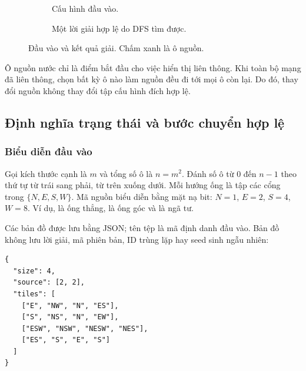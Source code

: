 \begin{figure}[H]
\centering
\begin{subfigure}{.43\textwidth}\centering
{}\caption{Cấu hình đầu vào.}\end{subfigure}
\hspace{8mm}
\begin{subfigure}{.43\textwidth}\centering
{}\caption{Một lời giải hợp lệ do DFS tìm được.}\end{subfigure}
\caption{Đầu vào  và kết quả giải. Chấm xanh là ô nguồn.}
\label{fig:board}
\end{figure}

Ô nguồn nước chỉ là điểm bắt đầu cho việc hiển thị liên thông. Khi toàn bộ
mạng đã liên thông, chọn bất kỳ ô nào làm nguồn đều đi tới mọi ô còn lại.
Do đó, thay đổi nguồn không thay đổi tập cấu hình đích hợp lệ.

\subsection{Định nghĩa trạng thái và bước chuyển hợp lệ}
\subsubsection{Biểu diễn đầu vào}

Gọi kích thước cạnh là $m$ và tổng số ô là $n=m^2$. Đánh số ô từ $0$ đến
$n-1$ theo thứ tự từ trái sang phải, từ trên xuống dưới. Mỗi hướng ống là tập
các cổng trong $\{N,E,S,W\}$. Mã nguồn biểu diễn bằng mặt nạ bit:
$N=1$, $E=2$, $S=4$, $W=8$. Ví dụ,  là ống thẳng,
 là ống góc và  là ngã tư.

Các bản đồ được lưu bằng JSON; tên tệp là mã định danh đầu vào. Bản đồ không
lưu lời giải, mã phiên bản, ID trùng lặp hay seed sinh ngẫu nhiên:
\begin{lstlisting}[numbers=none,basicstyle=\ttfamily\footnotesize]
{
  "size": 4,
  "source": [2, 2],
  "tiles": [
    ["E", "NW", "N", "ES"],
    ["S", "NS", "N", "EW"],
    ["ESW", "NSW", "NESW", "NES"],
    ["ES", "S", "E", "S"]
  ]
}
\end{lstlisting}

